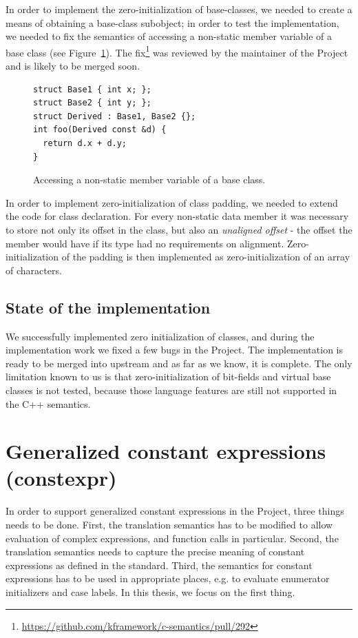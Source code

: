 \documentclass[nolot,nolof,nocover,printed]{fithesis3}
\newcommand{\Project}{Project\xspace}
\begin{document}
In order to implement the zero-initialization of base-classes, we needed to create a means of obtaining a base-class subobject; in order to test the implementation, we needed to fix the semantics of accessing a non-static member variable of a base class (see Figure~\ref{fig:baseClassMemberAccess}). The fix\footnote{\url{https://github.com/kframework/c-semantics/pull/292}} was reviewed by the maintainer of the Project and is likely to be merged soon.

\begin{figure}[ht]
\begin{lstlisting}
struct Base1 { int x; };
struct Base2 { int y; };
struct Derived : Base1, Base2 {};
int foo(Derived const &d) {
  return d.x + d.y;
}
\end{lstlisting}
\caption{Accessing a non-static member variable of a base class.}
\label{fig:baseClassMemberAccess}
\end{figure}

In order to implement zero-initialization of class padding, we needed to extend the code for class declaration. For every non-static data member it was necessary to store not only its offset in the class, but also an \textit{unaligned offset} - the offset the member would have if its type had no requirements on alignment. Zero-initialization of the padding is then implemented as zero-initialization of an array of characters.

\subsection{State of the implementation}

We successfully implemented zero initialization of classes, and during the implementation work we fixed a few bugs in the \Project. The implementation is ready to be merged into upstream and as far as we know, it is complete. The only limitation known to us is that zero-initialization of bit-fields and virtual base classes is not tested, because those language features are still not supported in the C++ semantics.

\section{Generalized constant expressions (constexpr)} \label{sec:impl:constexpr}

In order to support generalized constant expressions in the \Project, three things needs to be done. First, the translation semantics has to be modified to allow evaluation of complex expressions, and function calls in particular. Second, the translation semantics needs to capture the precise meaning of constant expressions as defined in the standard. Third, the semantics for constant expressions has to be used in appropriate places, e.g. to evaluate enumerator initializers and case labels. In this thesis, we focus on the first thing.
\end{document}
